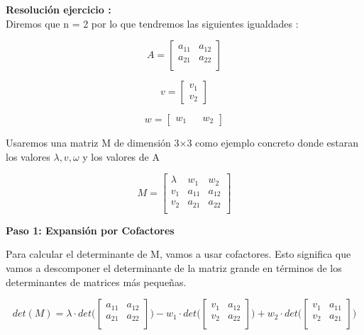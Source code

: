 \documentclass[11pt]{article}
\begin{document}
    \textbf{Resolución ejercicio :}\\
Diremos que n = 2 por lo que tendremos las siguientes igualdades :

\begin{equation}
A =
\begin{bmatrix}
a_{11} & a_{12} \\
a_{21} & a_{22} \\
\end{bmatrix}
\end{equation}

\begin{equation}
v =
\begin{bmatrix}
v_1 \\
v_2
\end{bmatrix}
\end{equation}

\begin{equation}
w =
\begin{bmatrix}
w_1 &&
w_2
\end{bmatrix}
\end{equation}

Usaremos una matriz M de dimensión 3×3 como ejemplo concreto donde
estaran los valores \(𝜆, 𝑣, 𝜔\) y los valores de A

\begin{equation}
M =
\begin{bmatrix}
\lambda & w_1 & w_2 \\
v_1 & a_{11} & a_{12} \\
v_2 & a_{21} & a_{22} \\
\end{bmatrix}
\end{equation}

    \textbf{Paso 1: Expansión por Cofactores}

Para calcular el determinante de M, vamos a usar cofactores. Esto
significa que vamos a descomponer el determinante de la matriz grande en
términos de los determinantes de matrices más pequeñas.

\begin{equation}
det(M) =
\lambda \cdot
det
 \Biggl(
\begin{bmatrix}
a_{11} & a_{12} \\
a_{21} & a_{22} \\
\end{bmatrix} 
 \Biggl)
-
w_1 \cdot
det
\Biggl(
\begin{bmatrix}
v_1 & a_{12} \\
v_2 & a_{22} \\
\end{bmatrix}
\Biggl)
+
w_2 \cdot 
det
\Biggl(
\begin{bmatrix}
v_1 & a_{11} \\
v_2 & a_{21} \\
\end{bmatrix} 
\Biggl)
\end{equation}
\end{document}

